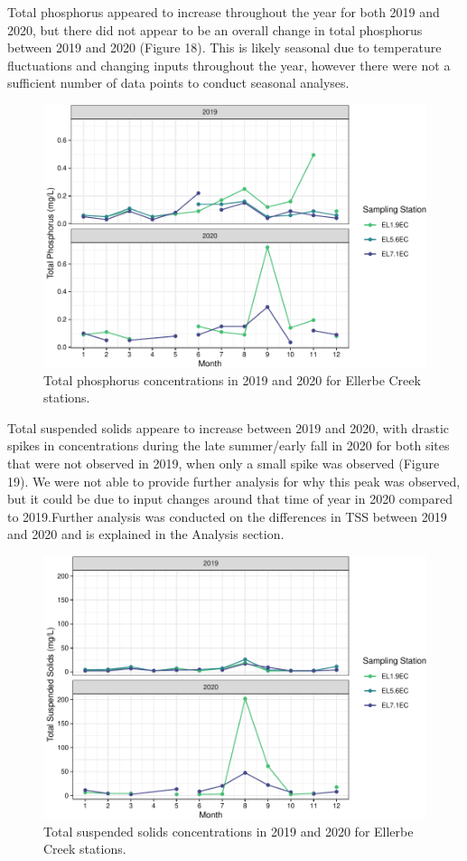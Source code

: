 \documentclass[
  12pt,
]{article}
\begin{document}
Total phosphorus appeared to increase throughout the year for both 2019
and 2020, but there did not appear to be an overall change in total
phosphorus between 2019 and 2020 (Figure 18). This is likely seasonal
due to temperature fluctuations and changing inputs throughout the year,
however there were not a sufficient number of data points to conduct
seasonal analyses.

\begin{figure}
\centering
\includegraphics{August_Lindborg_ENV872_Project_files/figure-latex/unnamed-chunk-19-1.pdf}
\caption{Total phosphorus concentrations in 2019 and 2020 for Ellerbe
Creek stations.}
\end{figure}

Total suspended solids appeare to increase between 2019 and 2020, with
drastic spikes in concentrations during the late summer/early fall in
2020 for both sites that were not observed in 2019, when only a small
spike was observed (Figure 19). We were not able to provide further
analysis for why this peak was observed, but it could be due to input
changes around that time of year in 2020 compared to 2019.Further
analysis was conducted on the differences in TSS between 2019 and 2020
and is explained in the Analysis section.

\begin{figure}
\centering
\includegraphics{August_Lindborg_ENV872_Project_files/figure-latex/unnamed-chunk-20-1.pdf}
\caption{Total suspended solids concentrations in 2019 and 2020 for
Ellerbe Creek stations.}
\end{figure}
\end{document}
